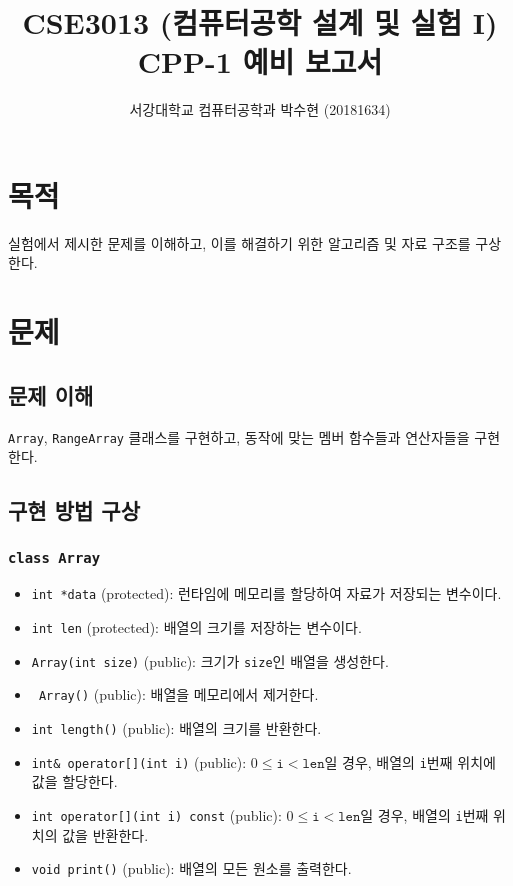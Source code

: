 
	


\title{CSE3013 (컴퓨터공학 설계 및 실험 I) \space \newline CPP-1 예비 보고서}
\author{서강대학교 컴퓨터공학과 박수현 (20181634)}
\maketitle

\section{목적}
실험에서 제시한 문제를 이해하고, 이를 해결하기 위한 알고리즘 및 자료 구조를 구상한다.

\section{문제}

\subsection{문제 이해}
\texttt{Array}, \texttt{RangeArray} 클래스를 구현하고, 동작에 맞는 멤버 함수들과 연산자들을 구현한다.

\subsection{구현 방법 구상}

\subsubsection{\texttt{class Array}}

\begin{itemize}
	\item \texttt{int *data} (protected): 런타임에 메모리를 할당하여 자료가 저장되는 변수이다.
	\item \texttt{int len} (protected): 배열의 크기를 저장하는 변수이다.
	\item \texttt{Array(int size)} (public): 크기가 \texttt{size}인 배열을 생성한다.
	\item \texttt{~Array()} (public): 배열을 메모리에서 제거한다.
	\item \texttt{int length()} (public): 배열의 크기를 반환한다.
	\item \texttt{int& operator[](int i)} (public): $0 \leq \texttt{i} < \texttt{len}$일 경우, 배열의 \texttt{i}번째 위치에 값을 할당한다.
	\item \texttt{int operator[](int i) const} (public): $0 \leq \texttt{i} < \texttt{len}$일 경우, 배열의 \texttt{i}번째 위치의 값을 반환한다.
	\item \texttt{void print()} (public): 배열의 모든 원소를 출력한다.
\end{itemize}

